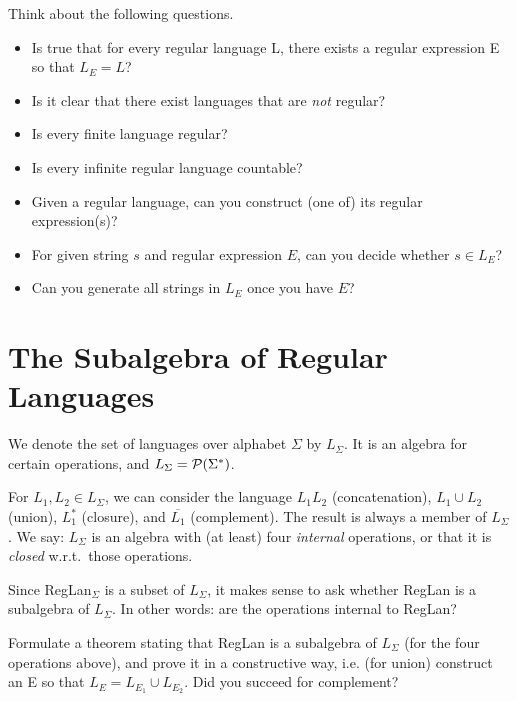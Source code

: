 \begin{exercise}
Think about the following questions.
\begin{itemize}
\item Is true that for every regular language L, there exists a regular
expression E so that $L_E = L$?

\item Is it clear that there exist languages that are \emph{not} regular?

\item Is every finite language regular?

\item Is every infinite regular language countable?

\item Given a regular language, can you construct (one of) its regular
expression(s)?

\item For given string $s$ and regular expression $E$, can you
decide whether $s \in L_E$?

\item Can you generate all strings in $L_E$ once you have $E$?
\end{itemize}
\end{exercise}


\section{The Subalgebra of Regular Languages}

We denote the set of languages over alphabet $\Sigma$ by
$L_\Sigma$. It is an algebra for certain operations, and
%
$L_\Sigma = {\cal P}(\Sigma^*)$.

For $L_1, L_2 \in L_\Sigma$, we can consider the language $L_1L_2$
(concatenation), $L_1 \cup L_2$ (union), $L_1^*$ (closure), and
$\overline{L_1}$ (complement). The result is always a member of
$L_\Sigma$. We say: $L_\Sigma$ is an algebra with (at least) four
\emph{internal} operations, or that it is \emph{closed} w.r.t.\ those operations.

Since RegLan${}_\Sigma$ is a subset of $L_\Sigma$, it makes sense to ask whether
RegLan is a subalgebra of $L_\Sigma$. In other words: are the
operations internal to RegLan?

\begin{exercise}
Formulate a theorem stating that RegLan is a
subalgebra of $L_\Sigma$ (for the four operations above), and prove it
in a constructive way, i.e. (for union) construct an E so that $L_E =
L_{E_1} \cup L_{E_2}$. Did you succeed for complement?
\end{exercise}


